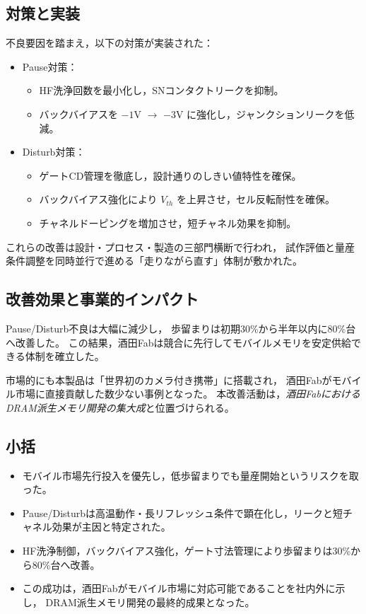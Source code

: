 \documentclass[conference]{IEEEtran}
\begin{document}
\subsection{対策と実装}
不良要因を踏まえ，以下の対策が実装された：
\begin{itemize}
  \item Pause対策：
    \begin{itemize}
      \item HF洗浄回数を最小化し，SNコンタクトリークを抑制。
      \item バックバイアスを $-1$V $\rightarrow$ $-3$V に強化し，ジャンクションリークを低減。
    \end{itemize}
  \item Disturb対策：
    \begin{itemize}
      \item ゲートCD管理を徹底し，設計通りのしきい値特性を確保。
      \item バックバイアス強化により $V_{th}$ を上昇させ，セル反転耐性を確保。
      \item チャネルドーピングを増加させ，短チャネル効果を抑制。
    \end{itemize}
\end{itemize}

これらの改善は設計・プロセス・製造の三部門横断で行われ，
試作評価と量産条件調整を同時並行で進める「走りながら直す」体制が敷かれた。

\subsection{改善効果と事業的インパクト}
Pause/Disturb不良は大幅に減少し，
歩留まりは初期30\%から半年以内に80\%台へ改善した。
この結果，酒田Fabは競合に先行してモバイルメモリを安定供給できる体制を確立した。  

市場的にも本製品は「世界初のカメラ付き携帯」に搭載され，
酒田Fabがモバイル市場に直接貢献した数少ない事例となった。
本改善活動は，\emph{酒田FabにおけるDRAM派生メモリ開発の集大成}と位置づけられる。

\subsection{小括}
\begin{itemize}
  \item モバイル市場先行投入を優先し，低歩留まりでも量産開始というリスクを取った。
  \item Pause/Disturbは高温動作・長リフレッシュ条件で顕在化し，リークと短チャネル効果が主因と特定された。
  \item HF洗浄制御，バックバイアス強化，ゲート寸法管理により歩留まりは30\%から80\%台へ改善。
  \item この成功は，酒田Fabがモバイル市場に対応可能であることを社内外に示し，
        DRAM派生メモリ開発の最終的成果となった。
\end{itemize}
\end{document}
